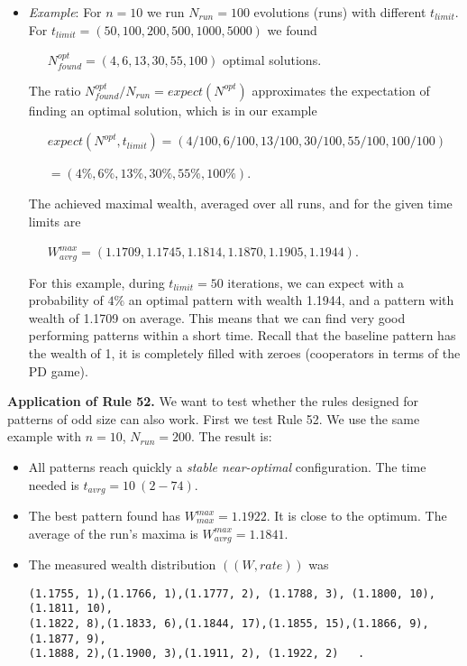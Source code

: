 \documentclass[10pt,a4paper]{article}  %
\begin{document}
\begin{itemize}
	\item 
      \textit{Example}: For $n=10$ we run $N_{run}=100$ evolutions (runs) with different $t_{limit}$. 
      For $t_{limit} =(50, 100, 200, 500, 1000, 5000)$ we found 

      ~~~$N^{opt}_{found}=(4,6,13,30,55,100)$ optimal solutions.

      The ratio $N^{opt}_{found}/N_{run}=\textit{expect}(N^{opt})$ approximates 
      the expectation of finding an optimal solution, which is in our example

      ~~~$\textit{expect}(N^{opt}, t_{limit}) = (4/100, 6/100, 13/100, 30/100, 55/100, 100/100)$ 

      ~~~$= (4\%, 6\%, 13\%, 30\%, 55\%, 100\%)$.

      The achieved maximal wealth, averaged over all runs, and for the given time limits are

       ~~~$W^{max}_{avrg}= (1.1709, 1.1745, 1.1814, 1.1870, 1.1905, 1.1944)$.

      For this example, during $t_{limit}=50$ iterations, we can expect with a probability of $4\%$ an optimal pattern with
      wealth 1.1944, and a pattern with wealth of 1.1709 on average. 
      This means that we can find very good performing patterns within a short time. %
      Recall that the baseline pattern has the wealth of 1,
      it is completely filled with zeroes (cooperators in terms of the PD game).

\end{itemize}


\textbf{Application of Rule 52.}
We want to test whether the rules designed for patterns of odd size can also work. 
First we test Rule 52.
We use the same example with $n=10$, $N_{run}=200$.
The result is:
\begin{itemize}
	\item 
  All patterns reach quickly a \textit{stable near-optimal} configuration.
  The  time needed is $t_{avrg}= 10 ~(2 -74)$.
  \item
  The best pattern found has $W^{max}_{max}=1.1922$. 
  It is close to the optimum.
  The average of the run's maxima is $W^{max}_{avrg}=1.1841$. 
  \item
  The measured wealth distribution $((W, rate))$ was
  
    \footnotesize
    \begin{verbatim}
(1.1755, 1),(1.1766, 1),(1.1777, 2), (1.1788, 3), (1.1800, 10),(1.1811, 10), 
(1.1822, 8),(1.1833, 6),(1.1844, 17),(1.1855, 15),(1.1866, 9), (1.1877, 9), 
(1.1888, 2),(1.1900, 3),(1.1911, 2), (1.1922, 2)   .
    \end{verbatim}
    \normalsize   

\end{itemize}
\end{document}
